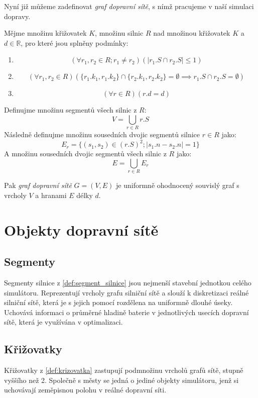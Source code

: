 Nyní již můžeme zadefinovat \emph{graf dopravní sítě}, s nímž pracujeme v naší simulaci
dopravy.

\begin{defn}\label{def:graf_site}
    Mějme množinu křižovatek $K$, množinu silnic $R$ nad množinou 
    křižovatek $K$ a $d \in \mathbb{R}$, pro které jsou splněny podmínky:
    \begin{enumerate}
        \item $$(\forall r_1, r_2 \in R; r_1 \neq r_2)\left(|r_1.S \cap r_2.S| \leq 1\right)$$
        \item $$(\forall r_1, r_2 \in R)\left(\{r_1.k_1, r_1.k_2\} 
            \cap \{r_2.k_1, r_2.k_2\} = \emptyset 
            \implies r_1.S \cap r_2.S = \emptyset \right)$$
        \item $$(\forall r \in R)(r.d = d)$$
    \end{enumerate}
    
    Definujme množinu segmentů všech silnic z $R$:
        $$V = \bigcup_{r \in R} r.S$$
    Následně definujme množinu sousedních dvojic segmentů silnice $r \in R$ jako:
        $$E_r = \{(s_1, s_2) \in (r.S)^2; |s_1.n - s_2.n| = 1\}$$
    A množinu sousedních dvojic segmentů všech silnic z $R$ jako:
        $$E = \bigcup_{r \in R} E_r$$

    Pak \emph{graf dopravní sítě} $G=(V, E)$ je uniformně ohodnocený souvislý 
    graf s vrcholy $V$ a hranami $E$ délky $d$.
\end{defn}

\section{Objekty dopravní sítě}

\subsection{Segmenty}
Segmenty silnice z \cref{def:segment_silnice} jsou nejmenší stavební jednotkou
celého simulátoru. Reprezentují vrcholy grafu silniční sítě a slouží k 
diskretizaci reálné silniční sítě, která je s jejich pomocí rozdělena 
na uniformně dlouhé úseky. Uchovává informaci o průměrné hladině baterie
v jednotlivých usecích dopravní sítě, která je využívána v optimalizaci.


\subsection{Křižovatky}
Křižovatky z \cref{def:krizovatka} zastupují podmnožinu vrcholů grafů
sítě, stupně vyššího než 2. Společně s městy se jedná o jediné objekty 
simulátoru, jenž si uchovávají zeměpisnou polohu v reálné dopravní síti.

